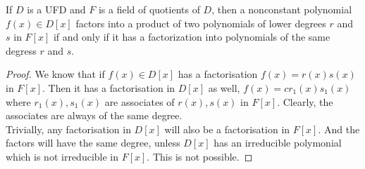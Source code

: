 \begin{corollary}
	If $D$ is a UFD and $F$ is a field of quotients of $D$, then a nonconstant polynomial $f(x) \in D[x]$ factors into a product of two polynomials of lower degrees $r$ and $s$ in $F[x]$ if and only if it has a factorization into polynomials of the same degress $r$ and $s$.
\end{corollary}
\begin{proof}
	We know that if $f(x) \in D[x]$ has a factorisation $f(x) = r(x)s(x)$ in $F[x]$.
	Then it has a factorisation in $D[x]$ as well, $f(x) = cr_1(x)s_1(x)$ where $r_1(x),s_1(x)$ are associates of $r(x), s(x)$ in $F[x]$.
	Clearly, the associates are always of the same degree.\\

	Trivially, any factorisation in $D[x]$ will also be a factorisation in $F[x]$.
	And the factors will have the same degree, unless $D[x]$ has an irreducible polymonial which is not irreducible in $F[x]$.
	This is not possible.
\end{proof}

